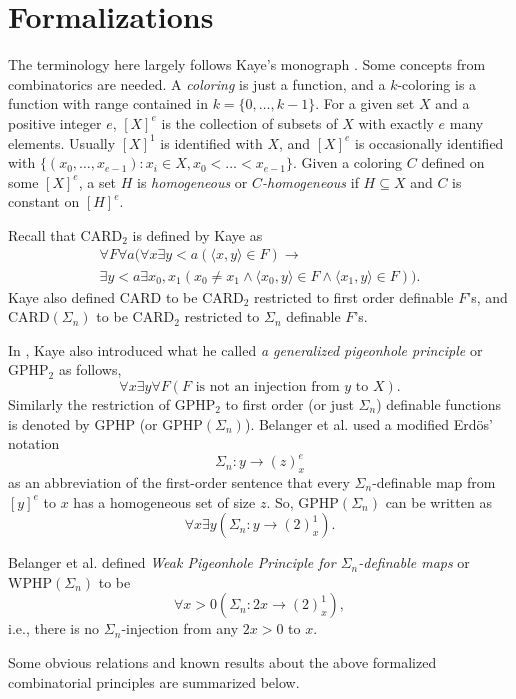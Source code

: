 \documentclass[twoside,a4paper]{amsart}
\theoremstyle{definition}
\theoremstyle{theorem}
\numberwithin{equation}{section}
\newcommand{\<}{\langle}
\renewcommand{\>}{\rangle}
\newcommand{\CARD}{\mathrm{CARD}}
\newcommand{\WPHP}{\mathrm{WPHP}}
\newcommand{\GPHP}{\mathrm{GPHP}}
\begin{document}
\section{Formalizations}\label{s:Formalizations}

The terminology here largely follows Kaye's monograph \cite{Kaye:MOPA}.
Some concepts from combinatorics are needed.
A \emph{coloring} is just a function, and a $k$-coloring is a function with range contained in $k = \{0,\ldots,k-1\}$.
For a given set $X$ and a positive integer $e$, $[X]^e$ is the collection of subsets of $X$ with exactly $e$ many elements.
Usually $[X]^1$ is identified with $X$, and $[X]^e$ is occasionally identified with $\{(x_0,\ldots,x_{e-1}): x_i \in X, x_0 < \ldots < x_{e-1}\}$.
Given a coloring $C$ defined on some $[X]^e$, 
 a set $H$ is \emph{homogeneous} or \emph{$C$-homogeneous} if $H \subseteq X$ and $C$ is constant on $[H]^e$.

Recall that $\CARD_2$ is defined by Kaye \cite{Kaye:1995.NDJFL} as
\begin{multline*}
  \forall F \forall a \big(\forall x \exists y < a (\<x,y\> \in F) \to \\
  \exists y < a \exists x_0, x_1 (x_0 \neq x_1 \wedge \<x_0,y\> \in F \wedge \<x_1,y\> \in F)\big).  
\end{multline*}
Kaye also defined $\CARD$ to be $\CARD_2$ restricted to first order definable $F$'s, and $\CARD(\Sigma_n)$ to be $\CARD_2$ restricted to $\Sigma_n$ definable $F$'s.

In \cite{Kaye:1995.NDJFL}, Kaye also introduced what he called \emph{a generalized pigeonhole principle} or $\GPHP_2$ as follows,
\[
  \forall x \exists y \forall F (F \text{ is not an injection from } y \text{ to } X).
\]
Similarly the restriction of $\GPHP_2$ to first order (or just $\Sigma_n$) definable functions is denoted by $\GPHP$ (or $\GPHP(\Sigma_n)$).
Belanger et al. \cite{BCWWY:2021} used a modified Erd\"{o}s' notation
\[
  \Sigma_n: y \to (z)^e_x
\] 
as an abbreviation of the first-order sentence that every $\Sigma_n$-definable map from $[y]^e$ to $x$ has a homogeneous set of size $z$.
So, $\GPHP(\Sigma_n)$ can be written as
\[
  \forall x \exists y (\Sigma_n: y \to (2)^1_x).
\]

Belanger et al. \cite{BCWWY:2021} defined \emph{Weak Pigeonhole Principle for $\Sigma_n$-definable maps} or $\WPHP(\Sigma_n)$ to be
\[
  \forall x > 0 (\Sigma_n: 2x \to (2)^1_x),
\]
i.e., there is no $\Sigma_n$-injection from any $2x > 0$ to $x$.

Some obvious relations and known results about the above formalized combinatorial principles are summarized below.
\end{document}
